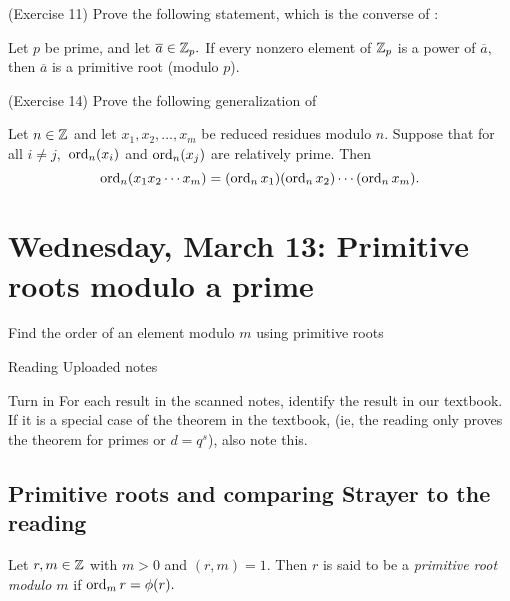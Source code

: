 \documentclass[letterpaper, 11 pt]{ximera}
\theoremstyle{definition}
\begin{document}
\begin{exercise}(Exercise 11)\label{read-ex11}
    Prove the following statement, which is the converse of :

    Let $p$ be prime, and let $\overline{a}\in\mathbb Z_p.$ If every nonzero element of $\mathbb Z_p$ is a power of $\overline{a},$ then $\overline{a}$ is a primitive root (modulo $p$).
\end{exercise}


\begin{exercise}(Exercise 14)
    Prove the following generalization of 
    
    
    \begin{lem*}
        Let $n\in\mathbb Z$ and let $x_1,x_2,\dots,x_m$ be reduced residues modulo $n$.  Suppose that for all $i\neq j,$ $\operatorname{ord}_n(x_i)$ and $\operatorname{ord}_n(x_j)$ are relatively prime. Then \[\operatorname{ord}_n(x_1 x_2\cdots x_m)=(\operatorname{ord}_n x_1)(\operatorname{ord}_n x_2)\cdots (\operatorname{ord}_n x_m).\]
    \end{lem*}
\end{exercise}

% 
% 

\section{Wednesday, March 13: Primitive roots modulo a prime}

\begin{obj}
    \item Find the order of an element modulo $m$ using primitive roots
\end{obj}


\begin{pre}
    \item[Reading] Uploaded notes
    \item[Turn in] For each result in the scanned notes, identify the result in our textbook. If it is a special case of the theorem in the textbook, (ie, the reading only proves the theorem for primes or $d=q^s$), also note this.

\end{pre}

\subsection{Primitive roots and comparing Strayer to the reading}
\begin{definition}\label{defn:prime-root}
    Let $r,m\in\mathbb Z$ with $m>0$ and $(r,m)=1.$ Then $r$ is said to be a \emph{primitive root modulo $m$} if $\operatorname{ord}_m r=\phi(r).$
\end{definition}
\end{document}
